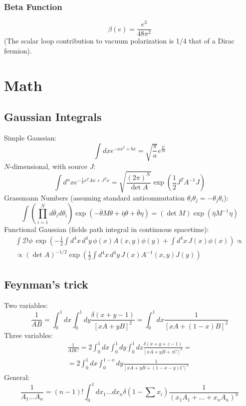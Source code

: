 \documentclass{article}
\begin{document}
\subsubsection*{Beta Function}
\begin{equation}
    \beta(e) = \frac{e^3}{48\pi^2}
\end{equation}
(The scalar loop contribution to vacuum polarization is 1/4 that of a Dirac fermion).
\newpage
\section{Math}
\subsection{Gaussian Integrals}
Simple Gaussian:
\begin{equation}
    \int dx  e^{-ax^2 + bx} = \sqrt{\frac{\pi}{a}}e^{\frac{b^2}{2a}}
\end{equation}
$N$-dimensional, with source $J$:
\begin{equation}
    \int d^n x  e^{-\frac{1}{2} x^T A x + J^T x} = \sqrt{\frac{(2\pi)^N}{\det A}} \exp\left( \frac{1}{2} J^T A^{-1} J \right)
\end{equation}
Grassmann Numbers (assuming standard anticommutation $\theta_i \theta_j = -\theta_j \theta_i$):
\begin{equation}
    \int \left( \prod_{i=1}^N d\bar{\theta}_i d\theta_i \right) \exp\left( -\bar{\theta} M \theta + \bar{\eta}\theta + \bar{\theta}\eta \right) = (\det M) \exp\left( \bar{\eta} M^{-1} \eta \right)
\end{equation}
Functional Gaussian (fields path integral in continuous spacetime):
\begin{equation}
\begin{gathered}
    \int \mathcal{D}\phi \, \exp\left( -\frac{1}{2} \int d^4x \, d^4y \, \phi(x)A(x,y)\phi(y) + \int d^4x \, J(x)\phi(x) \right) \propto \\ \propto (\det A)^{-1/2} \exp\left( \frac{1}{2} \int d^4x \, d^4y \, J(x)A^{-1}(x,y)J(y) \right)
\end{gathered}
\end{equation}
\subsection{Feynman's trick}
Two variables:
\begin{equation}
    \frac{1}{AB} = \int_0^1 dx \int_0^1 dy \frac{\delta(x+y-1)}{[xA+yB]^2} = \int_0^1 dx \frac{1}{[xA + (1-x)B]^2}
\end{equation}
Three variables:
\begin{equation}
\begin{gathered}
    \frac{1}{ABC} = 2 \int_0^1 dx \int_0^1 dy \int_0^1 dz \frac{\delta(x+y+z-1)}{[xA+yB+zC]^3} = \\ = 2 \int_0^1 dx \int_0^{1-x} dy \frac{1}{[xA+yB+(1-x-y)C]^3}
\end{gathered}
\end{equation}
General:
\begin{equation}
    \frac{1}{A_1 \dots A_n} = (n-1)! \int_0^1 dx_1 \dots dx_n \delta\left(1 - \sum x_i\right) \frac{1}{(x_1 A_1 + \dots + x_n A_n)^n}
\end{equation}
\end{document}
